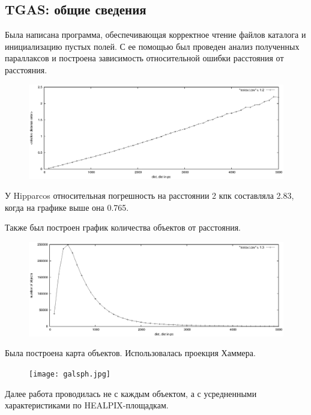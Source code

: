\documentclass[14pt]{article} %
\begin{document}
\subsection{TGAS: общие сведения}
Была написана программа, обеспечивающая корректное чтение файлов каталога и инициализацию пустых полей. С ее помощью был проведен анализ полученных параллаксов и построена зависимость относительной ошибки расстояния от расстояния.
\begin{figure}[h!]
\includegraphics[width=1\linewidth]{distvserr.eps}
\end{figure}

У Hipparcos относительная погрешность на расстоянии 2 кпк составляла 2.83, когда на графике выше она 0.765.

Также был построен график количества объектов от расстояния.
\begin{figure}[h!]
\includegraphics[width=1\linewidth]{distvsN.eps}
\end{figure}\newpage

Была построена карта объектов. Использовалась проекция Хаммера.
\begin{figure}[h!]
\texttt{[image: galsph.jpg]}
\end{figure}

Далее работа проводилась не с каждым объектом, а с усредненными характеристиками по HEALPIX-площадкам.
\end{document}
